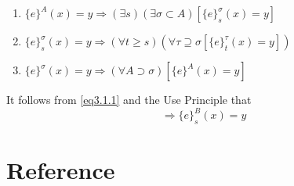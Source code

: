 \documentclass[11pt]{article}
\begin{document}
\begin{theorem}
\begin{enumerate}
\item \(\{e\}^A(x)=y\Longrightarrow(\exists s)(\exists \sigma\subset A)
      [\{e\}_s^\sigma(x)=y]\)
\item \(\{e\}_s^\sigma(x)=y\Longrightarrow(\forall t\ge
      s)(\forall\tau\supseteq\sigma
      [\{e\}_t^\tau(x)=y])\)
\item \(\{e\}^\sigma(x)=y\Longrightarrow(\forall A\supset\sigma)[\{e\}^A(x)=y]\)
\end{enumerate}
\end{theorem}

It follows from \eqref{eq3.1.1} and the Use Principle that
\begin{equation}
[\{e\}_s^A(x)=y\;\&\;A\restriction u=B\restriction u]
\Longrightarrow\{e\}_s^B(x)=y\label{eq3.1.3}
\end{equation}





\section{Reference}
\label{sec:org734e96e}


\end{document}
